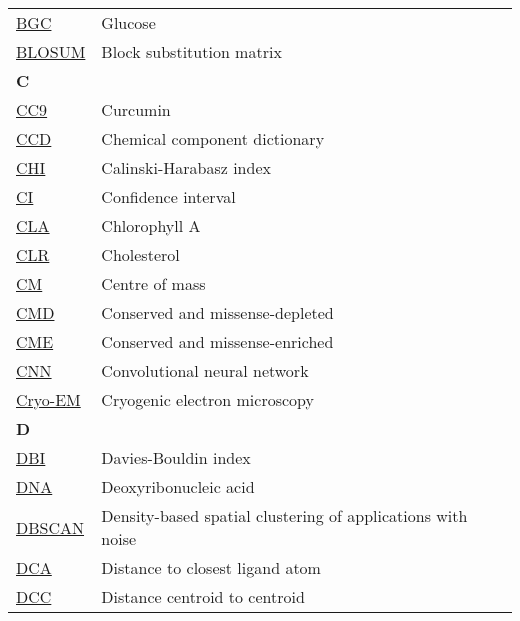 \begin{longtable}[l]{@{}p{2.5cm}p{12cm}@{}}
\textmd{\href{https://www.ebi.ac.uk/pdbe-srv/pdbechem/chemicalCompound/show/BGC}{BGC}} & Glucose \\
\textmd{\href{https://en.wikipedia.org/wiki/BLOSUM}{BLOSUM}} & Block substitution matrix \\[0.3175cm]
\textbf{\large C} & \\[0.25cm]
\textmd{\href{https://www.ebi.ac.uk/pdbe-srv/pdbechem/chemicalCompound/show/CC9}{CC9}} & Curcumin \\
\textmd{\href{https://www.wwpdb.org/data/ccd}{CCD}} & Chemical component dictionary \\
\textmd{\href{https://en.wikipedia.org/wiki/Calinski–Harabasz_index}{CHI}} & Calinski-Harabasz index \\
\textmd{\href{https://en.wikipedia.org/wiki/Confidence_interval}{CI}} & Confidence interval \\
\textmd{\href{https://www.ebi.ac.uk/pdbe-srv/pdbechem/chemicalCompound/show/CLA}{CLA}} & Chlorophyll A \\
\textmd{\href{https://www.ebi.ac.uk/pdbe-srv/pdbechem/chemicalCompound/show/CLR}{CLR}} & Cholesterol \\
\textmd{\href{https://en.wikipedia.org/wiki/Center_of_mass}{CM}} & Centre of mass \\
\textmd{\href{https://www.nature.com/articles/s42003-024-06117-5}{CMD}} & Conserved and missense-depleted \\
\textmd{\href{https://www.nature.com/articles/s42003-024-06117-5}{CME}} & Conserved and missense-enriched \\
\textmd{\href{https://en.wikipedia.org/wiki/Convolutional_neural_network}{CNN}} & Convolutional neural network \\
\textmd{\href{https://en.wikipedia.org/wiki/Cryogenic_electron_microscopy}{Cryo-EM}} & Cryogenic electron microscopy \\[0.3175cm]
\textbf{\large D} & \\[0.25cm]
\textmd{\href{https://en.wikipedia.org/wiki/Davies–Bouldin_index}{DBI}} & Davies-Bouldin index \\
\textmd{\href{https://en.wikipedia.org/wiki/DNA}{DNA}} & Deoxyribonucleic acid \\
\textmd{\href{https://en.wikipedia.org/wiki/DBSCAN}{DBSCAN}} & Density-based spatial clustering of applications with noise \\
\textmd{\href{https://academic.oup.com/bioinformatics/article/37/12/1681/6104838}{DCA}} & Distance to closest ligand atom \\
\textmd{\href{https://academic.oup.com/bioinformatics/article/37/12/1681/6104838}{DCC}} & Distance centroid to centroid \\

\end{longtable}
